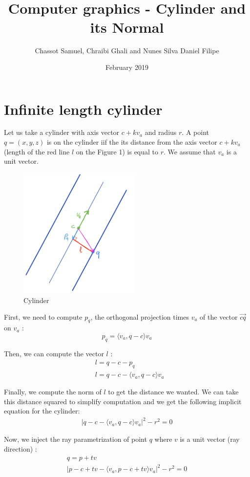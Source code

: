 \documentclass{article}
\title{Computer graphics - Cylinder and its Normal}
\author{Chassot Samuel, Chraibi Ghali and Nunes Silva Daniel Filipe}
\date{February 2019}
\begin{document}
\maketitle

\section{Infinite length cylinder}
Let us take a cylinder with axis vector $c + \textit{k} v_a$ and radius $\textit{r}$. A point $q = (x,y,z)$ is on the cylinder iif the its distance from the axis vector $c + \textit{k} v_a$ (length of the red line $l$ on the Figure 1) is equal to $\textit{r}$. We assume that $v_a$ is a unit vector.

\begin{figure}[h]
\centering
\includegraphics[width=6cm]{res/Cylinder_sketch.jpeg}
\caption{Cylinder}
\end{figure}

First, we need to compute $p_q$, the orthogonal projection times $v_a$ of the vector $\overrightarrow{cq}$ on $v_a$ :
$$p_q = \langle v_a, q-c\rangle  v_a$$

Then, we can compute the vector $l$ :
\begin{align*}
    &l = q-c-p_q \\
    &l = q-c - \langle v_a, q-c\rangle  v_a
\end{align*}

Finally, we compute the norm of $l$ to get the distance we wanted. We can take this distance squared to simplify computation and we get the following implicit equation for the cylinder:
\begin{gather*}
    |q-c-\langle v_a, q-c\rangle  v_a|^2 - r^2 = 0
\end{gather*}

Now, we inject the ray parametrization of point $q$ where $v$ is a unit vector (ray direction) :
\begin{gather*}
    q=p+tv \\
    |p-c+tv-\langle v_a, p-c+tv\rangle v_a|^2-r^2=0
\end{gather*}
\end{document}
